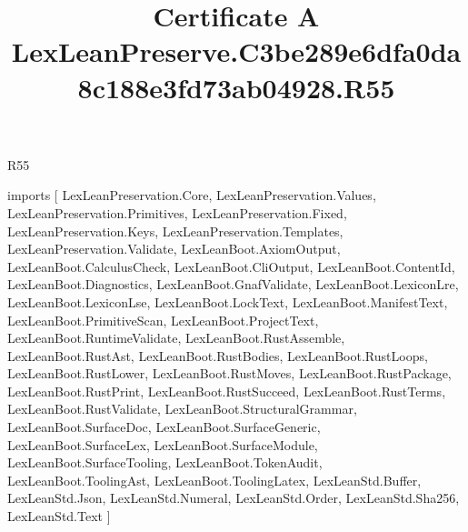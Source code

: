 \begin{lexlean}{R55}
\title{Certificate A LexLeanPreserve.C3be289e6dfa0da8c188e3fd73ab04928.R55}
\begin{coremodule}
imports [
  LexLeanPreservation.Core,
  LexLeanPreservation.Values,
  LexLeanPreservation.Primitives,
  LexLeanPreservation.Fixed,
  LexLeanPreservation.Keys,
  LexLeanPreservation.Templates,
  LexLeanPreservation.Validate,
  LexLeanBoot.AxiomOutput,
  LexLeanBoot.CalculusCheck,
  LexLeanBoot.CliOutput,
  LexLeanBoot.ContentId,
  LexLeanBoot.Diagnostics,
  LexLeanBoot.GnafValidate,
  LexLeanBoot.LexiconLre,
  LexLeanBoot.LexiconLse,
  LexLeanBoot.LockText,
  LexLeanBoot.ManifestText,
  LexLeanBoot.PrimitiveScan,
  LexLeanBoot.ProjectText,
  LexLeanBoot.RuntimeValidate,
  LexLeanBoot.RustAssemble,
  LexLeanBoot.RustAst,
  LexLeanBoot.RustBodies,
  LexLeanBoot.RustLoops,
  LexLeanBoot.RustLower,
  LexLeanBoot.RustMoves,
  LexLeanBoot.RustPackage,
  LexLeanBoot.RustPrint,
  LexLeanBoot.RustSucceed,
  LexLeanBoot.RustTerms,
  LexLeanBoot.RustValidate,
  LexLeanBoot.StructuralGrammar,
  LexLeanBoot.SurfaceDoc,
  LexLeanBoot.SurfaceGeneric,
  LexLeanBoot.SurfaceLex,
  LexLeanBoot.SurfaceModule,
  LexLeanBoot.SurfaceTooling,
  LexLeanBoot.TokenAudit,
  LexLeanBoot.ToolingAst,
  LexLeanBoot.ToolingLatex,
  LexLeanStd.Buffer,
  LexLeanStd.Json,
  LexLeanStd.Numeral,
  LexLeanStd.Order,
  LexLeanStd.Sha256,
  LexLeanStd.Text
]


\end{coremodule}
\end{lexlean}
